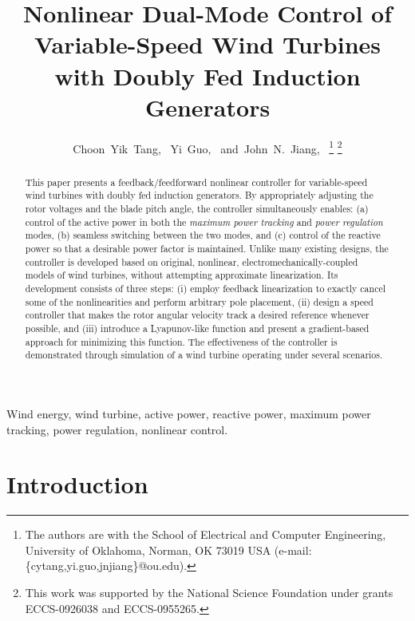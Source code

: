 \documentclass[journal]{IEEEtran}
\begin{document}
\title{Nonlinear Dual-Mode Control of Variable-Speed Wind Turbines with Doubly Fed Induction Generators}

\author{Choon~Yik~Tang,~
        Yi~Guo,~
        and~John~N.~Jiang,~
\thanks{The authors are with the School of Electrical and Computer Engineering, University of Oklahoma, Norman, OK 73019 USA (e-mail: \{cytang,yi.guo,jnjiang\}@ou.edu).}
\thanks{This work was supported by the National Science Foundation under grants ECCS-0926038 and ECCS-0955265.}}

\maketitle

\begin{abstract}
This paper presents a feedback/feedforward nonlinear controller for variable-speed wind turbines with doubly fed induction generators. By appropriately adjusting the rotor voltages and the blade pitch angle, the controller simultaneously enables: (a) control of the active power in both the {\em maximum power tracking} and {\em power regulation} modes, (b) seamless switching between the two modes, and (c) control of the reactive power so that a desirable power factor is maintained. Unlike many existing designs, the controller is developed based on original, nonlinear, electromechanically-coupled models of wind turbines, without attempting approximate linearization. Its development consists of three steps: (i) employ feedback linearization to exactly cancel some of the nonlinearities and perform arbitrary pole placement, (ii) design a speed controller that makes the rotor angular velocity track a desired reference whenever possible, and (iii) introduce a Lyapunov-like function and present a gradient-based approach for minimizing this function. The effectiveness of the controller is demonstrated through simulation of a wind turbine operating under several scenarios.
\end{abstract}

\begin{IEEEkeywords}
Wind energy, wind turbine, active power, reactive power, maximum power tracking, power regulation, nonlinear control.
\end{IEEEkeywords}

\section{Introduction}\label{sec:intro}
\end{document}
